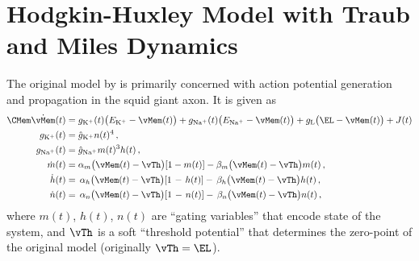 
\section{Hodgkin-Huxley Model with Traub and Miles Dynamics}
\label{app:hippocampal_hh}

The original model by \citet{hodgkin1952quantitative} is primarily concerned with action potential generation and propagation in the squid giant axon. It is given as
\begin{align*}
	\CMem \dot\vMem(t)
	&=    g_\mathrm{K^+}(t) \bigl(E_\mathrm{K^+} - \vMem(t)\bigr)
		+ g_\mathrm{Na^+}(t) \bigl(E_\mathrm{Na^+} - \vMem(t)\bigr)
		+ g_\mathrm{L} \bigl(\EL - \vMem(t)\bigr) + J(t) \\
	g_\mathrm{K^+}(t) &= \hat g_\mathrm{K^+} n(t)^4 \,, \\
	g_\mathrm{Na^+}(t) &= \hat g_\mathrm{Na^+} m(t)^3 h(t) \,, \\
	\dot m(t) &= \alpha_m\bigl(\vMem(t) - \vTh\bigr) [1 - m(t)]  - \beta_m\bigl(\vMem(t) - \vTh\bigr) m(t)  \,,\\
	\dot h(t) &= \,\alpha_h\bigl(\vMem(t) - \vTh\bigr) [1 \hspace{0.125em} - \hspace{0.125em} h(t)] - \, \beta_h\bigl(\vMem(t) - \vTh\bigr) h(t) \,,\\
	\dot n(t) &= \,\alpha_n\bigl(\vMem(t) - \vTh\bigr) [1 \hspace{0.125em} - \hspace{0.125em} n(t)] - \, \beta_n\bigl(\vMem(t) - \vTh\bigr) n(t) \,,
\end{align*}
where $m(t)$, $h(t)$, $n(t)$ are \enquote{gating variables} that encode state of the system, and $\vTh$ is a soft \enquote{threshold potential} that determines the zero-point of the original model (originally $\vTh = \EL$).


